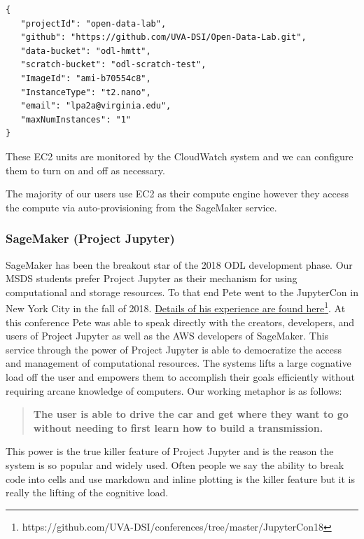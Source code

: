 \begin{verbatim}
{
   "projectId": "open-data-lab",
   "github": "https://github.com/UVA-DSI/Open-Data-Lab.git",
   "data-bucket": "odl-hmtt",
   "scratch-bucket": "odl-scratch-test",
   "ImageId": "ami-b70554c8",
   "InstanceType": "t2.nano",
   "email": "lpa2a@virginia.edu",
   "maxNumInstances": "1"
}
\end{verbatim}

These EC2 units are monitored by the CloudWatch system and we can configure them to turn on and off as necessary.

The majority of our users use EC2 as their compute engine however they access the compute via auto-provisioning from the SageMaker service.


\subsubsection{SageMaker (Project Jupyter)}
\label{sec:projectjupyter}

SageMaker has been the breakout star of the 2018 ODL development phase. Our MSDS students prefer Project Jupyter as their mechanism for using computational and storage resources. To that end Pete went to the JupyterCon in New York City in the fall of 2018. \href{https://github.com/UVA-DSI/conferences/tree/master/JupyterCon18}{Details of his experience are found here\footnote{\url{https://github.com/UVA-DSI/conferences/tree/master/JupyterCon18}}}.
At this conference Pete was able to speak directly with the creators, developers, and users of Project Jupyter as well as the AWS developers of SageMaker. This service through the power of Project Jupyter is able to democratize the access and management of computational resources. The systems lifts a large cognative load off the user and empowers them to accomplish their goals efficiently without requiring arcane knowledge of computers. Our working metaphor is as follows:

\begin{quote}
\textbf{
The user is able to drive the car and get where they want to go without needing to first learn how to build a transmission.
}
\end{quote}

This power is the true killer feature of Project Jupyter and is the reason the system is so popular and widely used. Often people we say the ability to break code into cells and use markdown and inline plotting is the killer feature but it is really the lifting of the cognitive load.

